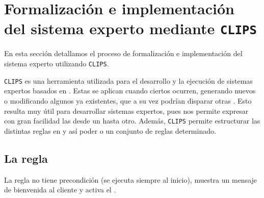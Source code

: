 % 

\section{Formalización e implementación del sistema experto mediante \texttt{CLIPS}}

En esta sección detallamos el proceso de formalización e implementación del sistema experto utilizando \texttt{CLIPS}.

\texttt{CLIPS} es una herramienta utilizada para el desarrollo y la ejecución de sistemas expertos basados en .
Estas  se aplican cuando ciertos  ocurren, generando nuevos  o modificando algunos ya existentes, que a su vez podrían disparar otras . Esto resulta muy útil para desarrollar sistemas expertos,
pues nos permite expresar con gran facilidad las  desde un  hasta otro.
Además, \texttt{CLIPS} permite estructurar las distintas reglas en  y así poder  o  un
conjunto de reglas determinado.

\subsection{La regla }
La regla  no tiene precondición (se ejecuta siempre al inicio), muestra un mensaje de bienvenida al cliente y activa el
.





